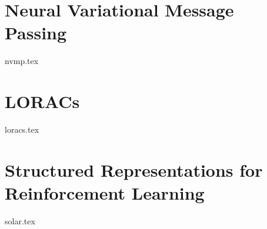 \chapter{Neural Variational Message Passing}
\label{chap:nvmp}
{nvmp.tex}

\chapter{LORACs}
\label{chap:loracs}
{loracs.tex}

\chapter{Structured Representations for Reinforcement Learning}
\label{chap:solar}
{solar.tex}
